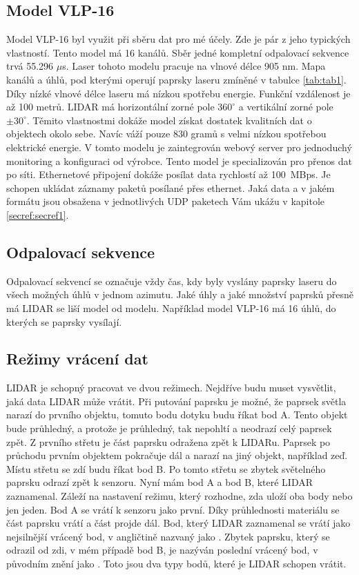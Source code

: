 \documentclass[czech,bachelor,dept420,male,cpdeclaration]{diploma}
\begin{document}
\subsection{Model VLP-16}
Model VLP-16 byl využit při sběru dat pro mé účely. Zde je pár z jeho typických vlastností. Tento model má 16 kanálů. Sběr jedné kompletní odpalovací sekvence trvá \num{55,296} $\mu$s. Laser tohoto modelu pracuje na vlnové délce \num{905} \si{\nano\metre}. Mapa kanálů a úhlů, pod kterými operují paprsky laseru zmíněné v tabulce \ref{tab:tab1}. Díky nízké vlnové délce laseru má nízkou spotřebu energie. Funkční vzdálenost je až \num{100} metrů. LIDAR má horizontální zorné pole $360^ \circ$ a vertikální zorné pole $\pm 30^\circ$. Těmito vlastnostmi dokáže model získat dostatek kvalitních dat o objektech okolo sebe. Navíc váží pouze \num{830} gramů s velmi nízkou spotřebou elektrické energie. V tomto modelu je zaintegrován webový server pro jednoduchý monitoring a konfiguraci od výrobce. Tento model je specializován pro přenos dat po síti. Ethernetové připojení dokáže posílat data rychlostí až \SI{100}{MBps}. Je schopen ukládat záznamy paketů posílané přes ethernet. Jaká data a v jakém formátu jsou obsažena v jednotlivých UDP paketech Vám ukážu v kapitole \ref{secref:secref1}.


\subsection{Odpalovací sekvence}
Odpalovací sekvencí se označuje vždy čas, kdy byly vyslány paprsky laseru do všech možných úhlů v jednom azimutu. 
Jaké úhly a jaké množství paprsků přesně má LIDAR se liší model od modelu. Například model VLP-16 má 16 úhlů, do kterých se paprsky vysílají. 

\subsection{Režimy vrácení dat}\label{sec:sec2}
LIDAR je schopný pracovat ve dvou režimech. Nejdříve budu muset vysvětlit, jaká data LIDAR může vrátit. Při putování paprsku je možné, že paprsek světla narazí do prvního objektu, tomuto bodu dotyku budu říkat bod A. Tento objekt bude průhledný, a protože je průhledný, tak nepohltí a neodrazí celý paprsek zpět. Z prvního střetu je část paprsku odražena zpět k LIDARu. Paprsek po průchodu prvním objektem pokračuje dál a narazí na jiný objekt, například zeď. Místu střetu se zdí budu říkat bod B. Po tomto střetu se zbytek světelného paprsku odrazí zpět k senzoru. Nyní mám bod A a bod B, které LIDAR zaznamenal. Záleží na nastavení režimu, který rozhodne, zda uloží oba body nebo jen jeden. Bod A se vrátí k senzoru jako první. Díky průhlednosti materiálu se část paprsku vrátí a část projde dál. Bod, který LIDAR zaznamenal se vrátí jako nejsilnější vrácený bod, v angličtině nazvaný jako . Zbytek paprsku, který se odrazil od zdi, v mém případě bod B, je nazýván poslední vrácený bod, v původním znění jako . Toto jsou dva typy bodů, které je LIDAR schopen vrátit.  
\end{document}
